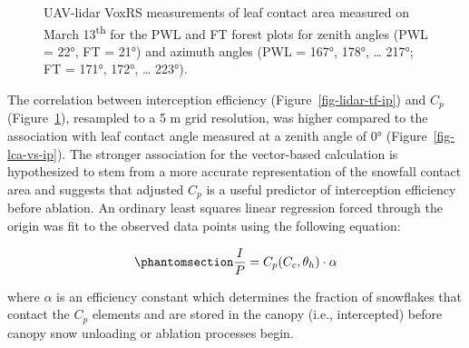 \documentclass[
  letterpaper,
  DIV=11,
  numbers=noendperiod]{scrartcl}
\begin{document}
\begin{figure}[H]


\caption{\label{fig-lidar-cc-cp}UAV-lidar VoxRS measurements of leaf
contact area measured on March 13\textsuperscript{th} for the PWL and FT
forest plots for zenith angles (PWL = 22°, FT = 21°) and azimuth angles
(PWL = 167°, 178°, \ldots{} 217°; FT = 171°, 172°, \ldots{} 223°).}

\end{figure}%

The correlation between interception efficiency
(Figure~\ref{fig-lidar-tf-ip}) and \(C_p\)
(Figure~\ref{fig-lidar-cc-cp}), resampled to a 5 m grid resolution, was
higher compared to the association with leaf contact angle measured at a
zenith angle of 0° (Figure~\ref{fig-lca-vs-ip}). The stronger
association for the vector-based calculation is hypothesized to stem
from a more accurate representation of the snowfall contact area and
suggests that adjusted \(C_p\) is a useful predictor of interception
efficiency before ablation. An ordinary least squares linear regression
forced through the origin was fit to the observed data points using the
following equation:

\begin{equation}\phantomsection\label{eq-lca-ip}{
  \frac{I}{P} = C_p(C_c, \theta_h) \cdot \alpha
}\end{equation}

where \(\alpha\) is an efficiency constant which determines the fraction
of snowflakes that contact the \(C_p\) elements and are stored in the
canopy (i.e., intercepted) before canopy snow unloading or ablation
processes begin.
\end{document}
